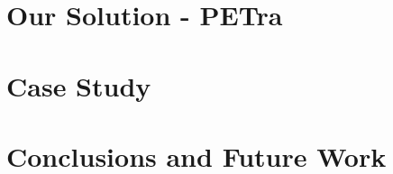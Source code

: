\documentclass[sigplan]{acmart}
\newcommand{\Abhishek}[1]{\todo[color=yellow!50, linecolor=black!50]{\textbf{Abhishek}: #1}}
\begin{document}
\section{Our Solution - PETra}








\section{Case Study}



\section{Conclusions and Future Work}






 
 
\end{document}
